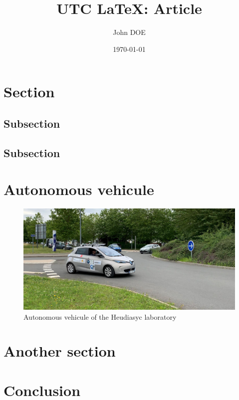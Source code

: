\documentclass[a4paper,12pt]{article}
\title{UTC \LaTeX : Article}
\author{John DOE}
\date{\today}
\begin{document}
\articletitle

\begin{multicols}{2}

\section{Section}
\subsection{Subsection}
\lipsum[1][1]
\lipsum[1][2]
\lipsum[1][3]

\subsection{Subsection}
\lipsum[1][4]
\lipsum[1][5]
\lipsum[1][6]
\lipsum[1][7]

\section{Autonomous vehicule}
\lipsum[2][1]
\lipsum[2][2]
\lipsum[2][3]
\lipsum[2][4]

\begin{figure}[H]
\centering
\includegraphics[width=\linewidth]{img/zoe_hds.jpg}
\caption{Autonomous vehicule of the Heudiasyc laboratory}
\end{figure}

\lipsum[3]

\section{Another section}
\lipsum[3]

\section{Conclusion}
\lipsum[4]

\end{multicols}
\end{document}
